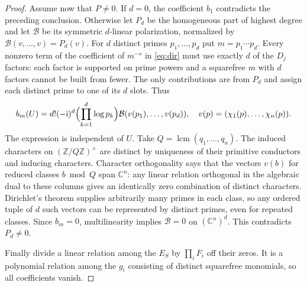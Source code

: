 \documentclass[11pt]{article}
\theoremstyle{definition}\newtheorem{definition}[theorem]{Definition}
\newcommand{\C}{\mathbb C}\newcommand{\R}{\mathbb R}\newcommand{\N}{\mathbb N}
\newcommand{\ii}{\mathrm i}\newcommand{\diag}{\operatorname{diag}}
\begin{document}
\begin{proof}
Assume now that $P\ne0$. If $d=0$, the coefficient $b_1$ contradicts the preceding conclusion. Otherwise let $P_d$ be the homogeneous part of highest degree and let $\mathcal B$ be its symmetric $d$-linear polarization, normalized by $\mathcal B(v,\ldots,v)=P_d(v)$. For $d$ distinct primes $p_1,\ldots,p_d$ put $m=p_1\cdots p_d$. Every nonzero term of the coefficient of $m^{-s}$ in \eqref{eq:dir} must use exactly $d$ of the $D_j$ factors: each factor is supported on prime powers and a squarefree $m$ with $d$ factors cannot be built from fewer. The only contributions are from $P_d$ and assign each distinct prime to one of its $d$ slots. Thus
\[
 b_m(U)=d!(-\ii)^d\Bigl(\prod_{k=1}^d\log p_k\Bigr)
    \mathcal B(v(p_1),\ldots,v(p_d)),\quad
 v(p)=(\chi_1(p),\ldots,\chi_n(p)).
\]
The expression is independent of $U$. Take $Q=\operatorname{lcm}(q_1,\ldots,q_n)$. The induced characters on $(\mathbb Z/Q\mathbb Z)^\times$ are distinct by uniqueness of their primitive conductors and inducing characters. Character orthogonality says that the vectors $v(b)$ for reduced classes $b\bmod Q$ span $\C^n$: any linear relation orthogonal in the algebraic dual to these columns gives an identically zero combination of distinct characters. Dirichlet's theorem supplies arbitrarily many primes in each class, so any ordered tuple of $d$ such vectors can be represented by distinct primes, even for repeated classes. Since $b_m=0$, multilinearity implies $\mathcal B=0$ on $(\C^n)^d$. This contradicts $P_d\ne0$.

Finally divide a linear relation among the $E_S$ by $\prod_i F_i$ off their zeros. It is a polynomial relation among the $g_i$ consisting of distinct squarefree monomials, so all coefficients vanish.
\end{proof}
\end{document}
